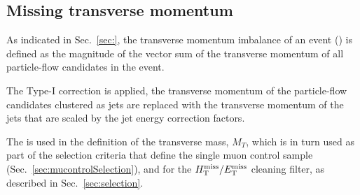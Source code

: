 \subsection{Missing transverse momentum}

As indicated in Sec.~\ref{sec:}, the transverse momentum imbalance of
an event (\met) is defined as the magnitude of the vector sum of the
transverse momentum of all particle-flow candidates in the event.

The Type-I \met correction \cite{Khachatryan:2014gga} is applied, \ie
the transverse momentum of the particle-flow candidates clustered as
jets are replaced with the transverse momentum of the jets that are
scaled by the jet energy correction factors.

The \met is used in the definition of the transverse mass, $M_{T}$,
which is in turn used as part of the selection criteria that define
the single muon control sample (Sec.~\ref{sec:mucontrolSelection}),
and for the $\mbox{$\mbox{$H_{\rm T}^{\rm miss}$} / \mbox{$E_\text{T}^{\rm miss}$}$}$ cleaning filter, as described in
Sec.~\ref{sec:selection}.

